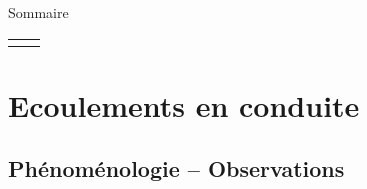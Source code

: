 
\begin{frame}{Sommaire}

\small
  
\hspace*{2mm}
\begin{tabular}{cc}
  		\begin{minipage}{62mm}
  			\tableofcontents[firstsection=-7]
      \vspace{15mm}
  		\end{minipage}
  		&   
  		\begin{minipage}{60cm}
		  \vspace*{-5mm}  
  		\end{minipage}
  	\end{tabular}

\vspace{0mm}

\end{frame}

\section{\bfseries Ecoulements en conduite}

\subsection{Phénoménologie -- Observations}

